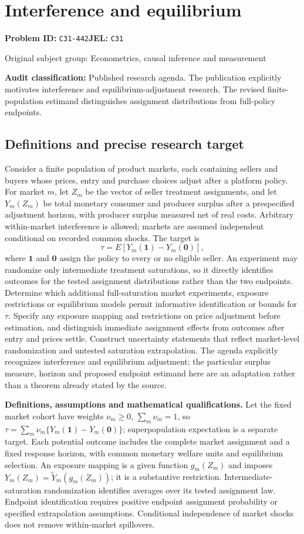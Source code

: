 \documentclass[11pt,a4paper]{article}
\begin{document}
\section*{Interference and equilibrium}
\textbf{Problem ID:} \texttt{C31-442}\quad \textbf{JEL:} \texttt{C31}\par
\label{problem:OP-0421}
{\sffamily\small\color{muted}Original subject group: Econometrics, causal inference and measurement\par}
\label{definitions:problem:30007703}
\textbf{Audit classification:} Published research agenda. The publication explicitly motivates interference and equilibrium-adjustment research. The revised finite-population estimand distinguishes assignment distributions from full-policy endpoints.
\subsection*{Definitions and precise research target}
Consider a finite population of product markets, each containing sellers and buyers whose prices, entry and purchase choices adjust after a platform policy. For market \(m\), let \(Z_m\) be the vector of seller treatment assignments, and let \(Y_m(Z_m)\) be total monetary consumer and producer surplus after a prespecified adjustment horizon, with producer surplus measured net of real costs. Arbitrary within-market interference is allowed; markets are assumed independent conditional on recorded common shocks. The target is
\[
\tau=E[Y_m(\mathbf1)-Y_m(\mathbf0)],
\]
where \(\mathbf1\) and \(\mathbf0\) assign the policy to every or no eligible seller. An experiment may randomize only intermediate treatment saturations, so it directly identifies outcomes for the tested assignment distributions rather than the two endpoints. Determine which additional full-saturation market experiments, exposure restrictions or equilibrium models permit informative identification or bounds for \(\tau\). Specify any exposure mapping and restrictions on price adjustment before estimation, and distinguish immediate assignment effects from outcomes after entry and prices settle. Construct uncertainty statements that reflect market-level randomization and untested saturation extrapolation. The agenda explicitly recognizes interference and equilibrium adjustment; the particular surplus measure, horizon and proposed endpoint estimand here are an adaptation rather than a theorem already stated by the source.

\textbf{Definitions, assumptions and mathematical qualifications.} Let the fixed market cohort have weights \(\nu_m\geq0\), \(\sum_m\nu_m=1\), so \(\tau=\sum_m\nu_m\{Y_m(\mathbf1)-Y_m(\mathbf0)\}\); superpopulation expectation is a separate target. Each potential outcome includes the complete market assignment and a fixed response horizon, with common monetary welfare units and equilibrium selection. An exposure mapping is a given function \(g_m(Z_m)\) and imposes \(Y_m(Z_m)=\widetilde Y_m(g_m(Z_m))\); it is a substantive restriction. Intermediate-saturation randomization identifies averages over its tested assignment law. Endpoint identification requires positive endpoint assignment probability or specified extrapolation assumptions. Conditional independence of market shocks does not remove within-market spillovers.
\end{document}
